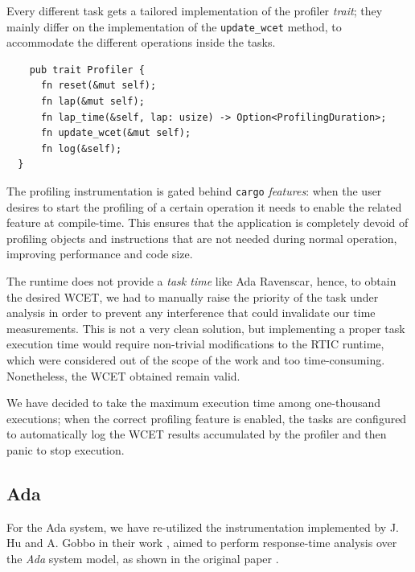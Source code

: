 Every different task gets a tailored implementation of the profiler
\textit{trait}; they mainly differ on the implementation of the
\texttt{update\_wcet} method, to accommodate the different operations inside the
tasks. 

\begin{listing}
  \begin{verbatim}
    pub trait Profiler {
      fn reset(&mut self);
      fn lap(&mut self);
      fn lap_time(&self, lap: usize) -> Option<ProfilingDuration>;
      fn update_wcet(&mut self);
      fn log(&self);
  }
  \end{verbatim}
  \caption[Profiler abstraction code]{Profiler trait used to extract WCET}
  \label{lst:profiler-abstraction}
\end{listing}

The profiling instrumentation is gated behind \texttt{cargo} \textit{features}:
when the user desires to start the profiling of a certain operation it needs to
enable the related feature at compile-time. This ensures that the application is
completely devoid of profiling objects and instructions that are not needed
during normal operation, improving performance and code size. 

The runtime does not provide a \textit{task time} like Ada Ravenscar, hence, to
obtain the desired WCET, we had to manually raise the priority of the task under
analysis in order to prevent any interference that could invalidate our time
measurements. 
This is not a very clean solution, but implementing a proper task execution time
would require non-trivial modifications to the RTIC runtime, which were
considered out of the scope of the work and too time-consuming. Nonetheless, the
WCET obtained remain valid. 

We have decided to take the maximum execution time among one-thousand
executions; when the correct profiling feature is enabled, the tasks are
configured to automatically log the WCET results accumulated by the profiler and
then panic to stop execution. 

\subsection{Ada}

For the Ada system, we have re-utilized the instrumentation implemented
by J. Hu and A. Gobbo in their work \cite{huJiayihuSRT2024}, aimed to perform
response-time analysis over the \textit{Ada} system model, as shown in the
original paper \cite{burnsGuideUseAda2004}.

